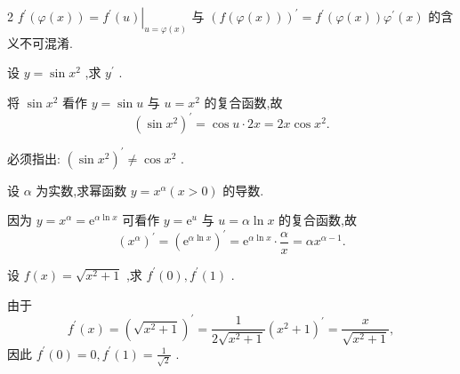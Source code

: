 \begin{remark}
2 \({f}^{\prime }\left( {\varphi \left( x\right) }\right)  = {\left. {f}^{\prime }\left( u\right) \right| }_{u = \varphi \left( x\right) }\) 与 \({\left( f\left( \varphi \left( x\right) \right) \right) }^{\prime } = {f}^{\prime }\left( {\varphi \left( x\right) }\right) {\varphi }^{\prime }\left( x\right)\) 的含义不可混淆.
\end{remark}


\begin{example}
设 \(y = \sin {x}^{2}\) ,求 \({y}^{\prime }\) .
\end{example}


\begin{solution}
将 \(\sin {x}^{2}\) 看作 \(y = \sin u\) 与 \(u = {x}^{2}\) 的复合函数,故
\[
{\left( \sin {x}^{2}\right) }^{\prime } = \cos u \cdot  {2x} = {2x}\cos {x}^{2}.
\]
\end{solution}

\begin{remark}
必须指出: \({\left( \sin {x}^{2}\right) }^{\prime } \neq  \cos {x}^{2}\) .
\end{remark}


\begin{example}
设 \(\alpha\) 为实数,求幂函数 \(y = {x}^{\alpha }\left( {x > 0}\right)\) 的导数.
\end{example}


\begin{solution}
因为 \(y = {x}^{\alpha } = {\mathrm{e}}^{\alpha \ln x}\) 可看作 \(y = {\mathrm{e}}^{u}\) 与 \(u = \alpha \ln x\) 的复合函数,故
\[
{\left( {x}^{\alpha }\right) }^{\prime } = {\left( {\mathrm{e}}^{\alpha \ln x}\right) }^{\prime } = {\mathrm{e}}^{\alpha \ln x} \cdot  \frac{\alpha }{x} = \alpha {x}^{\alpha  - 1}.
\]
\end{solution}

\begin{example}
设 \(f\left( x\right)  = \sqrt{{x}^{2} + 1}\) ,求 \({f}^{\prime }\left( 0\right) ,{f}^{\prime }\left( 1\right)\) .
\end{example}


\begin{solution}
由于
\[
{f}^{\prime }\left( x\right)  = {\left( \sqrt{{x}^{2} + 1}\right) }^{\prime } = \frac{1}{2\sqrt{{x}^{2} + 1}}{\left( {x}^{2} + 1\right) }^{\prime } = \frac{x}{\sqrt{{x}^{2} + 1}},
\]
因此 \({f}^{\prime }\left( 0\right)  = 0,{f}^{\prime }\left( 1\right)  = \frac{1}{\sqrt{2}}\) .
\end{solution}


